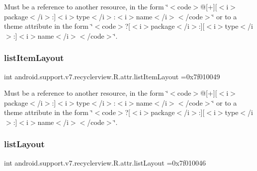 Must be a reference to another resource, in the form \char`\"{}$<$code$>$@\mbox{[}+\mbox{]}\mbox{[}$<$i$>$package$<$/i$>$\+:\mbox{]}$<$i$>$type$<$/i$>$\+:$<$i$>$name$<$/i$>$$<$/code$>$\char`\"{} or to a theme attribute in the form \char`\"{}$<$code$>$?\mbox{[}$<$i$>$package$<$/i$>$\+:\mbox{]}\mbox{[}$<$i$>$type$<$/i$>$\+:\mbox{]}$<$i$>$name$<$/i$>$$<$/code$>$\char`\"{}. \mbox{\label{classandroid_1_1support_1_1v7_1_1recyclerview_1_1R_1_1attr_af48baca074ab26ace5ff3f4c708b839c}} 
\subsubsection{\texorpdfstring{list\+Item\+Layout}{listItemLayout}}
{\footnotesize\ttfamily int android.\+support.\+v7.\+recyclerview.\+R.\+attr.\+list\+Item\+Layout =0x7f010049\hspace{0.3cm}{\ttfamily [static]}}

Must be a reference to another resource, in the form \char`\"{}$<$code$>$@\mbox{[}+\mbox{]}\mbox{[}$<$i$>$package$<$/i$>$\+:\mbox{]}$<$i$>$type$<$/i$>$\+:$<$i$>$name$<$/i$>$$<$/code$>$\char`\"{} or to a theme attribute in the form \char`\"{}$<$code$>$?\mbox{[}$<$i$>$package$<$/i$>$\+:\mbox{]}\mbox{[}$<$i$>$type$<$/i$>$\+:\mbox{]}$<$i$>$name$<$/i$>$$<$/code$>$\char`\"{}. \mbox{\label{classandroid_1_1support_1_1v7_1_1recyclerview_1_1R_1_1attr_a0f96df4d5ad81cb624cd152e87a94281}} 
\subsubsection{\texorpdfstring{list\+Layout}{listLayout}}
{\footnotesize\ttfamily int android.\+support.\+v7.\+recyclerview.\+R.\+attr.\+list\+Layout =0x7f010046\hspace{0.3cm}{\ttfamily [static]}}

